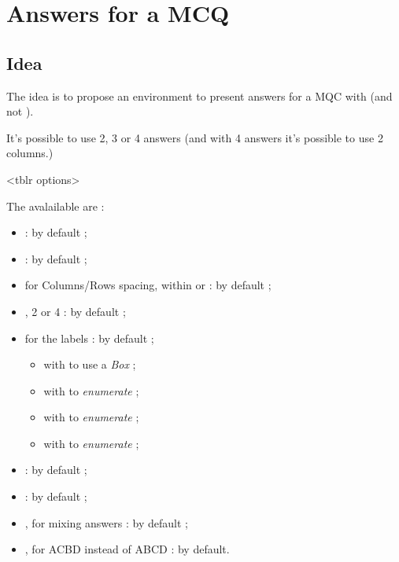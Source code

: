 \documentclass[english,11pt,a4paper]{article}
\begin{document}
\newpage

\section{Answers for a MCQ}

\subsection{Idea}

The idea is to propose an environment to present answers for a MQC with  (and not ).

\smallskip

It's possible to use 2, 3 or 4 answers (and with 4 answers it's possible to use 2 columns.)

\begin{codehigh}[language=latex/latex3,style/main=teal!25,style/code=teal!25]
<tblr options>
\end{codehigh}

The avalailable  are :

\begin{itemize}
	\item {} :  by default ;
	\item {}  :  by default ;
	\item {} for Columns/Rows spacing, within  or  : \MontreCode{6pt/2pt} by default ;
	\item {}, 2 or 4 :  by default ;
	\item {} for the labels :  by default ;
	\begin{itemize}
		\item with  to use a \textit{Box} ;
		\item with  to \textit{enumerate}  ;
		\item with  to \textit{enumerate}  ;
		\item with  to \textit{enumerate}  ;
	\end{itemize}
	\item {} :  by default ;
	\item {} :  by default ;
	\item {}, for mixing answers :  by default ;
	\item {}, for ACBD instead of ABCD :  by default.
\end{itemize}
\end{document}
